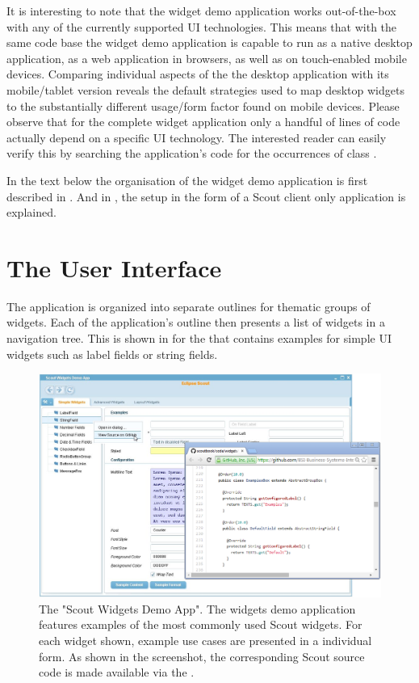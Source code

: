 \documentclass[a4paper,10pt,twoside]{book}
\begin{document}
{It is interesting to note that the widget demo application works out-of-the-box with any of the currently supported UI technologies. 
This means that with the same code base the widget demo application is capable to run as a native desktop application, as a web application in browsers, as well as on touch-enabled mobile devices. 
Comparing individual aspects of the the desktop application with its mobile/tablet version reveals the default strategies used to map desktop widgets to the substantially different usage/form factor found on mobile devices. 
Please observe that for the complete widget application only a handful of lines of code actually depend on a specific UI technology. 
The interested reader can easily verify this by searching the application's code for the occurrences of class .

In the text below the organisation of the widget demo application is first described in . 
And in , the setup in the form of a Scout client only application is explained.

\section{The User Interface}

The application is organized into separate outlines for thematic groups of widgets. 
Each of the application's outline then presents a list of widgets in a navigation tree.
This is shown in  for the  that contains examples for simple UI widgets such as label fields or string fields.

\begin{figure}
\includegraphics[width=14cm]{widgetapp_github_menu.png}
\caption{The "Scout Widgets Demo App". 
The widgets demo application features examples of the most commonly used Scout widgets.
For each widget shown, example use cases are presented in a individual form. 
As shown in the screenshot, the corresponding Scout source code is made available via the . }
\end{figure}

}
\end{document}
